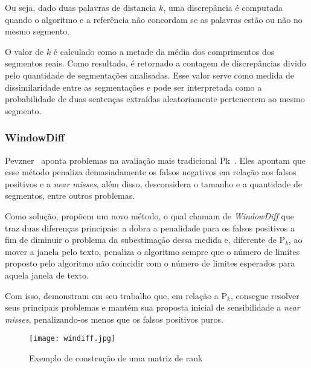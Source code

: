 Ou seja, dado duas palavras de distancia $k$, uma discrepância é computada quando o algoritmo e a referência não concordam se as palavras estão ou não no mesmo segmento.

O valor de $k$ é calculado como a metade da média dos comprimentos dos segmentos reais. Como resultado, é retornado a contagem de discrepâncias divido pelo quantidade de segmentações analisadas. Esse valor serve como medida de dissimilaridade entre as segmentações e pode ser interpretada como a probabilidade de duas sentenças extraídas aleatoriamente pertencerem ao mesmo segmento.



\subsubsection{WindowDiff}

Pevzner~\cite{Pevzner200219} aponta problemas na avaliação mais tradicional Pk~\cite{Beeferman1999}. Eles apontam que esse método penaliza demasiadamente os falsos negativos em relação aos falsos positivos e a \textit{near misses}, além disso, desconsidera o tamanho e a quantidade de segmentos, entre outros problemas.

Como solução, propõem um novo método, o qual chamam de \textit{WindowDiff} que traz duas diferenças principais: a dobra a penalidade para os falsos positivos a fim de diminuir o problema da subestimação dessa medida e, diferente de P$_k$, ao mover a janela pelo texto, penaliza o algoritmo sempre que o número de limites proposto pelo algoritmo não coincidir com o número de limites esperados para aquela janela de texto. 

Com isso, demonstram em seu trabalho que, em relação a P$_k$, consegue resolver seus principais problemas e mantém sua proposta inicial de sensibilidade a \textit{near misses}, penalizando-os menos que os falsos positivos puros.


  \begin{figure}[!h]

	\centering
	\texttt{[image: windiff.jpg]}
	\caption{Exemplo de construção de uma matriz de rank}
	\label{fig:exemplosegmentacao}

  \end{figure}
  
  


